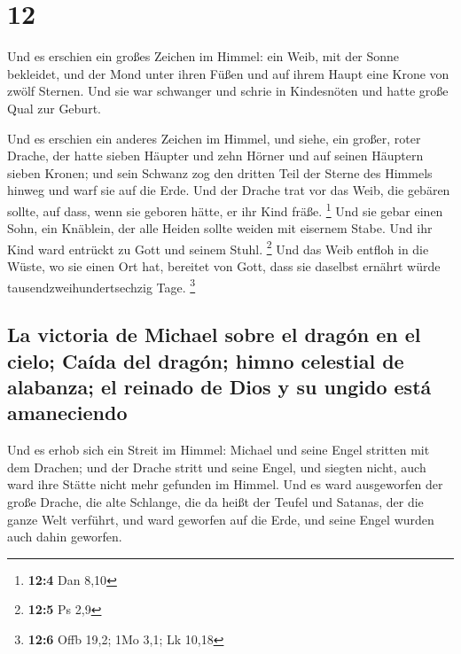 \hypertarget{section-11}{%
\section{12}\label{section-11}}

 Und es erschien ein großes Zeichen im Himmel: ein Weib,
mit der Sonne bekleidet, und der Mond unter ihren Füßen und auf ihrem
Haupt eine Krone von zwölf Sternen.  Und sie war schwanger
und schrie in Kindesnöten und hatte große Qual zur Geburt.

 Und es erschien ein anderes Zeichen im Himmel, und siehe,
ein großer, roter Drache, der hatte sieben Häupter und zehn Hörner und
auf seinen Häuptern sieben Kronen;  und sein Schwanz zog
den dritten Teil der Sterne des Himmels hinweg und warf sie auf die
Erde. Und der Drache trat vor das Weib, die gebären sollte, auf dass,
wenn sie geboren hätte, er ihr Kind fräße. \footnote{\textbf{12:4} Dan
  8,10}  Und sie gebar einen Sohn, ein Knäblein, der alle
Heiden sollte weiden mit eisernem Stabe. Und ihr Kind ward entrückt zu
Gott und seinem Stuhl. \footnote{\textbf{12:5} Ps 2,9} 
Und das Weib entfloh in die Wüste, wo sie einen Ort hat, bereitet von
Gott, dass sie daselbst ernährt würde tausendzweihundertsechzig Tage.
\footnote{\textbf{12:6} Offb 19,2; 1Mo 3,1; Lk 10,18}

\hypertarget{la-victoria-de-michael-sobre-el-draguxf3n-en-el-cielo-cauxedda-del-draguxf3n-himno-celestial-de-alabanza-el-reinado-de-dios-y-su-ungido-estuxe1-amaneciendo}{%
\subsection{La victoria de Michael sobre el dragón en el cielo; Caída
del dragón; himno celestial de alabanza; el reinado de Dios y su ungido
está
amaneciendo}\label{la-victoria-de-michael-sobre-el-draguxf3n-en-el-cielo-cauxedda-del-draguxf3n-himno-celestial-de-alabanza-el-reinado-de-dios-y-su-ungido-estuxe1-amaneciendo}}

 Und es erhob sich ein Streit im Himmel: Michael und seine
Engel stritten mit dem Drachen; und der Drache stritt und seine Engel,
 und siegten nicht, auch ward ihre Stätte nicht mehr
gefunden im Himmel.  Und es ward ausgeworfen der große
Drache, die alte Schlange, die da heißt der Teufel und Satanas, der die
ganze Welt verführt, und ward geworfen auf die Erde, und seine Engel
wurden auch dahin geworfen.

